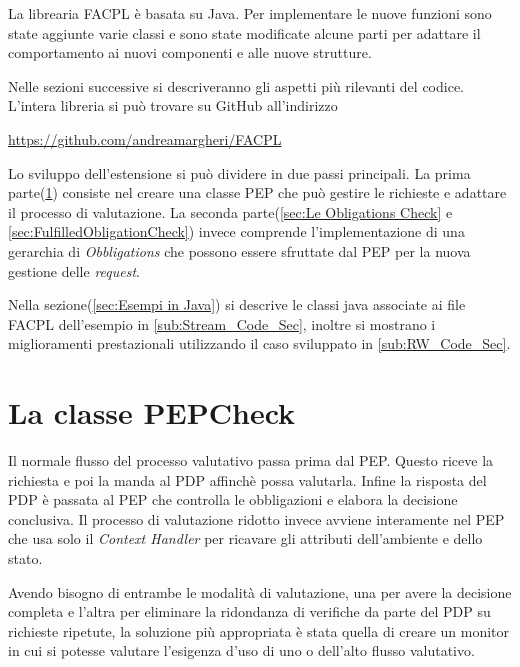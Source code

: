 \label{chap:Estensione della libreria FACPL}
La librearia \ac{FACPL} è basata su Java. Per implementare le nuove funzioni sono state aggiunte varie classi e sono state modificate
alcune parti per adattare il comportamento ai nuovi componenti e alle nuove strutture.\par
Nelle sezioni successive si descriveranno gli aspetti più rilevanti del codice. L'intera libreria si può trovare su
GitHub all'indirizzo
\begin{center}
  \url{https://github.com/andreamargheri/FACPL}
\end{center}
Lo sviluppo dell'estensione si può dividere in due passi principali.
La prima parte(\ref{sec:PEPCheck}) consiste nel creare una classe \ac{PEP} che può gestire le richieste e adattare il processo di valutazione.
La seconda parte(\ref{sec:Le Obligations Check} e \ref{sec:FulfilledObligationCheck})
invece comprende l'implementazione di una gerarchia di \emph{Obbligations} che possono essere
sfruttate dal \ac{PEP} per la nuova gestione delle \emph{request}. \par
Nella sezione(\ref{sec:Esempi in Java}) si descrive le classi java associate ai file \ac{FACPL}
dell'esempio in \ref{sub:Stream_Code_Sec}, inoltre si mostrano i miglioramenti
prestazionali utilizzando il caso sviluppato in \ref{sub:RW_Code_Sec}.
\section{La classe PEPCheck}
\label{sec:PEPCheck}
Il normale flusso del processo valutativo passa prima dal \ac{PEP}. Questo riceve la richiesta e poi la manda al
PDP affinchè possa valutarla. Infine la risposta del PDP è passata al \ac{PEP} che controlla le obbligazioni e
elabora la decisione conclusiva.
Il processo di valutazione ridotto invece avviene interamente nel \ac{PEP} che usa solo il \emph{Context Handler}
per ricavare gli attributi dell'ambiente e dello stato.

Avendo bisogno di entrambe le modalità di valutazione, una per avere la decisione completa e l'altra per eliminare la
ridondanza di verifiche da parte del \ac{PDP} su richieste ripetute,
la soluzione più appropriata è stata quella di creare un monitor
in cui si potesse valutare l'esigenza d'uso di uno o dell'alto flusso valutativo.

